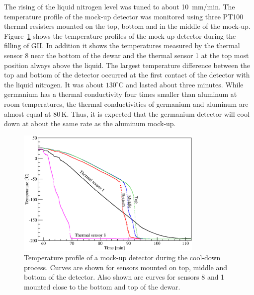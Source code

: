 The rising of the liquid nitrogen level was tuned to about
10~mm/min. The temperature profile of the mock-up detector was
monitored using three PT100 thermal resisters mounted on the top,
bottom and in the middle of the mock-up. Figure~\ref{fig:ii:temp}
shows the temperature profiles of the mock-up detector during the
filling of GII. In addition it shows the temperatures measured by the
thermal sensor 8 near the bottom of the dewar and the thermal sensor 1
at the top most position always above the liquid. The largest
temperature difference between the top and bottom of the detector
occurred at the first contact of the detector with the liquid
nitrogen. It was about $130^{\circ}$C and lasted about three
minutes. While germanium has a thermal conductivity four times smaller
than aluminum at room temperatures, the thermal conductivities of
germanium and aluminum are almost equal at 80\,K. Thus, it is expected
that the germanium detector will cool down at about the same rate as
the aluminum mock-up.

\begin{figure}[htbp]
\centering
\includegraphics[width=0.8\textwidth]{temp}
\caption{Temperature profile of a mock-up detector during the
cool-down process. Curves are shown for sensors mounted on top, middle
and bottom of the detector. Also shown are curves for sensors 8 and 1
mounted close to the bottom and top of the dewar.}
\label{fig:ii:temp}
\end{figure}

